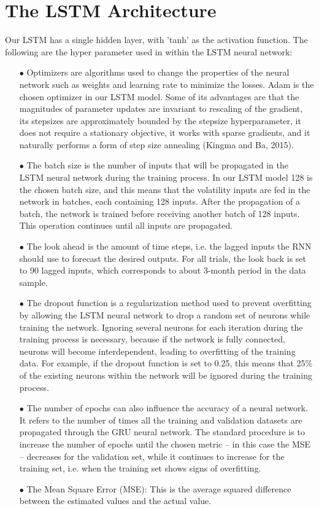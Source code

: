 \documentclass[a4paper,11pt,oneside]{book}
\begin{document}
\section{The LSTM Architecture}
Our LSTM has a single hidden layer,  with 'tanh' as the activation function. The following are the hyper parameter used in within the LSTM neural network:
\begin{itemize}

\item[$\bullet$]   
Optimizers are algorithms used to change the properties of the neural network such as weights and learning rate to minimize the losses. Adam is the chosen optimizer in our LSTM model. Some of its advantages are that the magnitudes of parameter updates are invariant to
rescaling of the gradient, its stepsizes are approximately bounded by the stepsize hyperparameter,
it does not require a stationary objective, it works with sparse gradients, and it naturally performs a
form of step size annealing (Kingma and Ba, 2015).
\item[$\bullet$] The batch size is the number of inputs that will be propagated in the
LSTM neural network during the training process. In our LSTM model 128 is the chosen batch size, and this means that the volatility inputs are
fed in the network in batches, each containing 128 inputs. After
the propagation of a batch, the network is trained before receiving another
batch of 128 inputs. This operation continues until all inputs are propagated.
\item[$\bullet$] The look ahead is the amount of time steps, i.e. the lagged
inputs the RNN should use to forecast the desired outputs. For all trials, the look back is set to 90 lagged inputs, which
corresponds to about 3-month period in the data sample.
\item[$\bullet$] The dropout function is a regularization method used to prevent overfitting by
allowing the LSTM neural network to drop a random set of neurons while
training the network. Ignoring several neurons for each iteration during the
training process is necessary, because if the network is fully connected,
neurons will become interdependent, leading to overfitting of the training data. For example, if the dropout function is set to 0.25, this means that 25\% of the existing
neurons within the network will be ignored during the training process.
\item[$\bullet$] The number of epochs can also influence the accuracy of a neural network. It
refers to the number of times all the training and validation datasets are
propagated through the GRU neural network. The standard procedure is to
increase the number of epochs until the chosen metric – in this case the MSE
– decreases for the validation set, while it continues to increase for the training
set, i.e. when the training set shows signs of overfitting.
\item[$\bullet$] The Mean Square Error (MSE): This is the average squared difference between the estimated values and the actual value.


\end{itemize}
\end{document}

